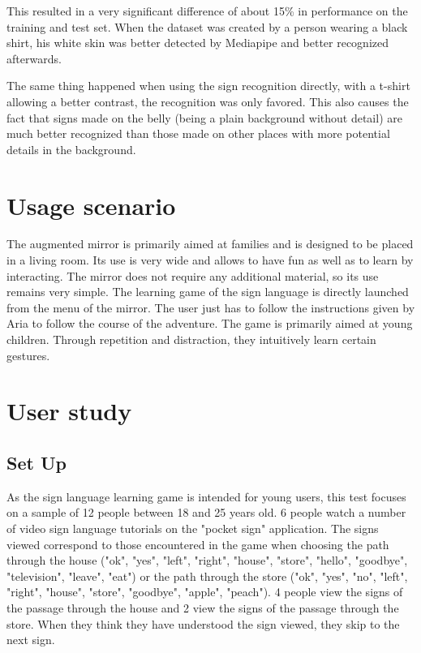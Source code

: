 This resulted in a very significant difference of about 15\% in performance on the training and test set. When the dataset was created by a person wearing a black shirt, his white skin was better detected by Mediapipe and better recognized afterwards. 

The same thing happened when using the sign recognition directly, with a t-shirt allowing a better contrast, the recognition was only favored. This also causes the fact that signs made on the belly (being a plain background without detail) are much better recognized than those made on other places with more potential details in the background.

\section{Usage scenario}

The augmented mirror is primarily aimed at families and is designed to be placed in a living room. Its use is very wide and allows to have fun as well as to learn by interacting.
The mirror does not require any additional material, so its use remains very simple.
The learning game of the sign language is directly launched from the menu of the mirror. The user just has to follow the instructions given by Aria to follow the course of the adventure. The game is primarily aimed at young children. Through repetition and distraction, they intuitively learn certain gestures.

\section{User study}

\subsection{Set Up}

As the sign language learning game is intended for young users, this test focuses on a sample of 12 people between 18 and 25 years old.
6 people watch a number of video sign language tutorials on the "pocket sign" application. The signs viewed correspond to those encountered in the game when choosing the path through the house ("ok", "yes", "left", "right", "house", "store", "hello", "goodbye", "television", "leave", "eat") or the path through the store ("ok", "yes", "no", "left", "right", "house", "store", "goodbye", "apple", "peach"). 4 people view the signs of the passage through the house and 2 view the signs of the passage through the store.
When they think they have understood the sign viewed, they skip to the next sign. 

